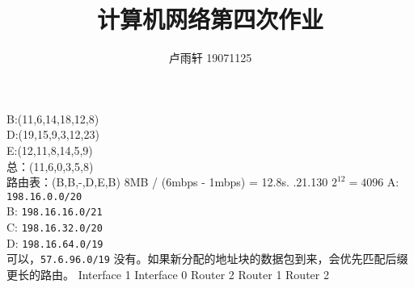 \documentclass{ctexart}
\title{计算机网络第四次作业}
\author{卢雨轩 19071125}
\begin{document}
\maketitle

\begin{outline}[enumerate]
    \1[6.]
    B:(11,6,14,18,12,8)\\
    D:(19,15,9,3,12,23) \\
    E:(12,11,8,14,5,9) \\
    总：(11,6,0,3,5,8) \\
    路由表：(B,B,-,D,E,B)
    \1[19.] 
    8MB / (6mbps - 1mbps) = 12.8s.
    .21.130
    \1[28.]
    $2^{12} = 4096$
    \1[30.]
    A: \texttt{198.16.0.0/20} \\
    B: \texttt{198.16.16.0/21} \\
    C: \texttt{198.16.32.0/20} \\
    D: \texttt{198.16.64.0/19} \\
    \1[31.]
    可以，\texttt{57.6.96.0/19}
    \1[32.]
    没有。如果新分配的地址块的数据包到来，会优先匹配后缀更长的路由。
    \1[33.]
    \2[(a)] Interface 1
    \2[(b)] Interface 0
    \2[(c)] Router 2
    \2[(d)] Router 1
    \2[(e)] Router 2
\end{outline}
\end{document}
